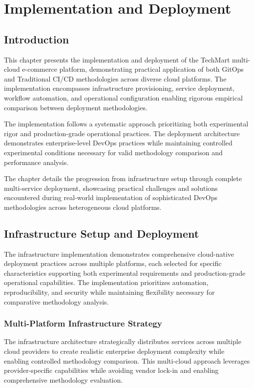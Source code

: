 \chapter{Implementation and Deployment}

\section{Introduction}

This chapter presents the implementation and deployment of the TechMart multi-cloud e-commerce platform, demonstrating practical application of both GitOps and Traditional CI/CD methodologies across diverse cloud platforms. The implementation encompasses infrastructure provisioning, service deployment, workflow automation, and operational configuration enabling rigorous empirical comparison between deployment methodologies.

The implementation follows a systematic approach prioritizing both experimental rigor and production-grade operational practices. The deployment architecture demonstrates enterprise-level DevOps practices while maintaining controlled experimental conditions necessary for valid methodology comparison and performance analysis.

The chapter details the progression from infrastructure setup through complete multi-service deployment, showcasing practical challenges and solutions encountered during real-world implementation of sophisticated DevOps methodologies across heterogeneous cloud platforms.

\section{Infrastructure Setup and Deployment}

The infrastructure implementation demonstrates comprehensive cloud-native deployment practices across multiple platforms, each selected for specific characteristics supporting both experimental requirements and production-grade operational capabilities. The implementation prioritizes automation, reproducibility, and security while maintaining flexibility necessary for comparative methodology analysis.

\subsection{Multi-Platform Infrastructure Strategy}

The infrastructure architecture strategically distributes services across multiple cloud providers to create realistic enterprise deployment complexity while enabling controlled methodology comparison. This multi-cloud approach leverages provider-specific capabilities while avoiding vendor lock-in and enabling comprehensive methodology evaluation.

